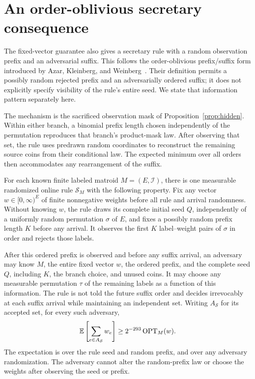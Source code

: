 \section{An order-oblivious secretary consequence}\label{sec:secretary}

The fixed-vector guarantee also gives a secretary rule with a random
observation prefix and an adversarial suffix. This follows the
order-oblivious prefix/suffix form introduced by Azar, Kleinberg, and
Weinberg~\cite[Definition 1, Section 3]{AKW14}. Their definition permits a
possibly random rejected prefix and an adversarially ordered suffix; it
does not explicitly specify
visibility of the rule's entire seed. We state that information pattern
separately here.

The mechanism is the sacrificed observation mask of
Proposition~\ref{prop:hidden}. Within either branch, a binomial prefix
length chosen independently of the permutation reproduces that branch's
product-mask law.
After observing that set, the rule uses predrawn random coordinates to
reconstruct the remaining source coins from their conditional law.
The expected minimum over all orders then accommodates any rearrangement
of the suffix.

\begin{corollary}
\label{cor:secretary}
For each known finite labeled matroid $M=(E,\mathcal I)$, there is one
measurable randomized online rule $\mathcal S_M$ with the following
property. Fix any vector $w\in[0,\infty)^E$ of finite nonnegative weights
before all rule and arrival randomness. Without knowing $w$, the rule
draws its complete initial seed $Q$, independently of a uniformly random
permutation $\sigma$ of $E$, and fixes a possibly random prefix length
$K$ before any arrival. It observes the first $K$ label--weight pairs of
$\sigma$ in order and rejects those labels.

After this ordered prefix is observed and before any suffix arrival, an
adversary may know $M$, the entire fixed vector $w$, the ordered prefix,
and the complete seed $Q$, including $K$, the branch choice, and unused
coins. It may choose any
measurable permutation $\tau$ of the remaining labels as a function of
this information. The rule is not told the future suffix order and decides
irrevocably at each suffix arrival while maintaining an independent set.
Writing $A_{\mathcal S}$ for its accepted set, for every such adversary,
\begin{equation}\label{eq:secretary-guarantee}
 \mathbb E\left[\sum_{e\in A_{\mathcal S}}w_e\right]
 \ge 2^{-293}\operatorname{OPT}_M(w).
\end{equation}
The expectation is over the rule seed and random prefix, and over any
adversary randomization. The adversary cannot alter the random-prefix law
or choose the weights after observing the seed or prefix.
\end{corollary}

